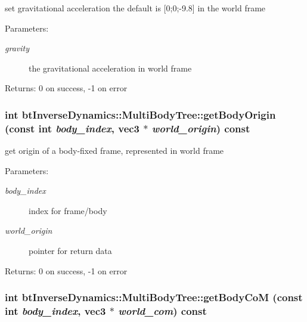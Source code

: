 set gravitational acceleration the default is \mbox{[}0;0;-9.8\mbox{]} in the world frame \begin{Desc}
\item[Parameters:]
\begin{description}
\item[{\em gravity}]the gravitational acceleration in world frame \end{description}
\end{Desc}
\begin{Desc}
\item[Returns:]0 on success, -1 on error \end{Desc}
\hypertarget{classbt_inverse_dynamics_1_1_multi_body_tree_14722e25a8c6cc0cb0d1ba848577e174}{
\subsubsection[getBodyOrigin]{\setlength{\rightskip}{0pt plus 5cm}int btInverseDynamics::MultiBodyTree::getBodyOrigin (const int {\em body\_\-index}, \/  {\bf vec3} $\ast$ {\em world\_\-origin}) const}}
\label{classbt_inverse_dynamics_1_1_multi_body_tree_14722e25a8c6cc0cb0d1ba848577e174}


get origin of a body-fixed frame, represented in world frame \begin{Desc}
\item[Parameters:]
\begin{description}
\item[{\em body\_\-index}]index for frame/body \item[{\em world\_\-origin}]pointer for return data \end{description}
\end{Desc}
\begin{Desc}
\item[Returns:]0 on success, -1 on error \end{Desc}
\hypertarget{classbt_inverse_dynamics_1_1_multi_body_tree_86d4152e8487c354a725e71e92851002}{
\subsubsection[getBodyCoM]{\setlength{\rightskip}{0pt plus 5cm}int btInverseDynamics::MultiBodyTree::getBodyCoM (const int {\em body\_\-index}, \/  {\bf vec3} $\ast$ {\em world\_\-com}) const}}
\label{classbt_inverse_dynamics_1_1_multi_body_tree_86d4152e8487c354a725e71e92851002}


